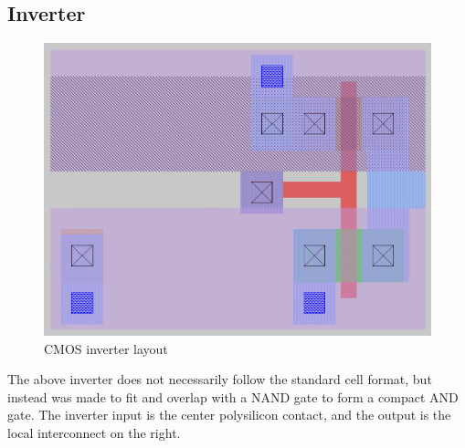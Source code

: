 \documentclass[11pt]{article}
\begin{document}
\subsection*{Inverter}
\begin{figure}[H]
  \centering
  \includegraphics[width=\linewidth]{media/inverter_layout.png}
  \caption{CMOS inverter layout}
\end{figure}

The above inverter does not necessarily follow the standard cell format, but instead was made to fit and overlap with a NAND gate to form a compact AND gate. The inverter input is the center polysilicon contact, and the output is the local interconnect on the right.
\end{document}

